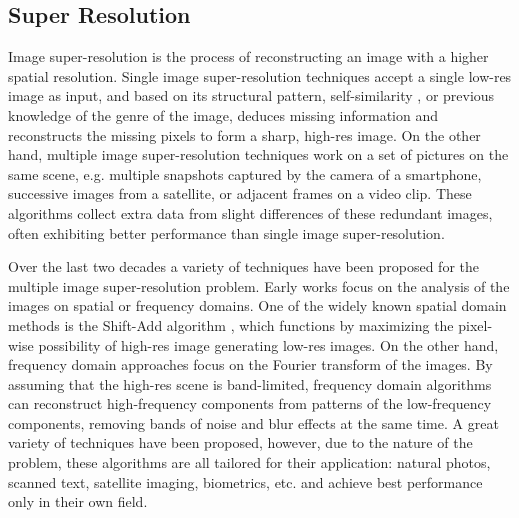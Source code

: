 \subsection{Super Resolution}
Image super-resolution is the process of reconstructing an image with a higher spatial resolution. Single image super-resolution techniques accept a single low-res image as input, and based on its structural pattern, self-similarity \cite{suetake2008image}, or previous knowledge of the genre of the image, deduces missing information and reconstructs the missing pixels to form a sharp, high-res image. On the other hand, multiple image super-resolution techniques work on a set of pictures on the same scene, e.g. multiple snapshots captured by the camera of a smartphone, successive images from a satellite, or adjacent frames on a video clip. These algorithms collect extra data from slight differences of these redundant images, often exhibiting better performance than single image super-resolution.

Over the last two decades a variety of techniques have been proposed for the multiple image super-resolution problem. Early works focus on the analysis of the images on spatial or frequency domains. One of the widely known spatial domain methods is the Shift-Add algorithm \cite{farsiu2003robust}, which functions by maximizing the pixel-wise possibility of high-res image generating low-res images. On the other hand, frequency domain approaches focus on the Fourier transform of the images. By assuming that the high-res scene is band-limited, frequency domain algorithms can reconstruct high-frequency components from patterns of the low-frequency components, removing bands of noise and blur effects at the same time. A great variety of techniques have been proposed, however, due to the nature of the problem, these algorithms are all tailored for their application: natural photos, scanned text, satellite imaging, biometrics, etc. and achieve best performance only in their own field.

